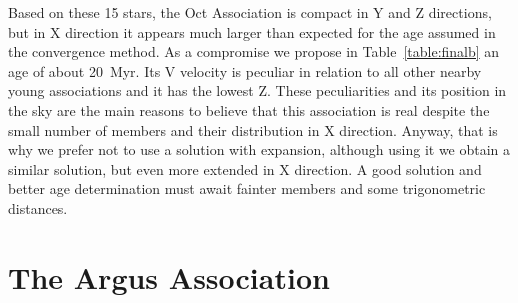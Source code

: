 \documentclass[11pt,twoside]{book}
\begin{document}
Based on these 15 stars, the Oct Association is compact in Y and Z directions,
but in X direction it appears much larger than expected for the age assumed in the convergence method.
As a compromise we propose in  Table~\ref{table:finalb} an age of about 20~Myr.
Its V velocity is peculiar in relation to all other nearby young associations
and it has the lowest Z.
These peculiarities and its position in the sky are the main reasons to believe that this association is
real despite  the small number of members and their distribution in X direction.
Anyway, that is why we prefer not to use a solution with expansion, although
using it we obtain a similar solution, but even more extended in X direction.
A good solution and better age determination must await fainter members and some trigonometric distances.

\section{The Argus Association}
\end{document}
